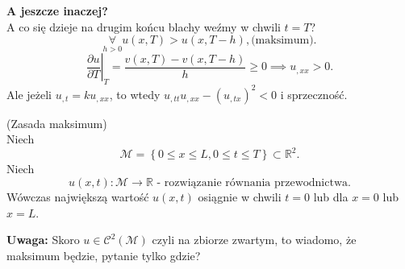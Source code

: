 \documentclass[../main.tex]{subfiles}
\begin{document}
\textbf{A jeszcze inaczej?}\\
A co się dzieje na drugim końcu blachy weźmy w chwili $t = T$?
\[
		\underset{h>0}{\forall} u(x,T) > u(x,T-h),\text{(maksimum)}
.\]
\[
		\left.\frac{\partial u}{\partial T} \right|_{T} = \frac{v(x,T) - v(x,T-h)}{h} \ge 0 \implies u_{,x x}>0
.\]
Ale jeżeli $u_{,t} = ku_{,x x}$, to wtedy $u_{,t t}u_{,x x} - (u_{,tx})^2 < 0$ i sprzeczność.
\begin{tw}
		(Zasada maksimum)\\
		Niech
		\[
				\mathcal{M} = \left\{ 0\le x \le L, 0 \le t \le T \right\} \subset\mathbb{R}^2
		.\]
		Niech \[
				u(x,t) : \mathcal{M}\to \mathbb{R} \text{ - rozwiązanie równania przewodnictwa.}
		\]
		Wówczas największą wartość $u(x,t)$ osiągnie w chwili $t = 0$ lub dla $x = 0$ lub $x = L$.\\
\end{tw}
		\textbf{Uwaga:} Skoro $u\in \mathcal{C}^2(\mathcal{M})$ czyli na zbiorze zwartym, to wiadomo, że maksimum będzie, pytanie tylko gdzie?
\end{document}
